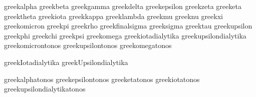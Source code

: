  greekalpha              {}
 greekbeta               {}
 greekgamma              {}
 greekdelta              {}
 greekepsilon            {}
 greekzeta               {}
 greeketa                {}
 greektheta              {}
 greekiota               {}
 greekkappa              {}
 greeklambda             {}
 greekmu                 {}
 greeknu                 {}
 greekxi                 {}
 greekomicron            {}
 greekpi                 {}
 greekrho                {}
 greekfinalsigma         {}
 greeksigma              {}
 greektau                {}
 greekupsilon            {}
 greekphi                {}
 greekchi                {}
 greekpsi                {}
 greekomega              {}
 greekiotadialytika      {}
 greekupsilondialytika   {}
 greekomicrontonos       {}
 greekupsilontonos       {}
 greekomegatonos         {}

 greekIotadialytika          {}
 greekUpsilondialytika       {}

 greekalphatonos             {}
 greekepsilontonos           {}
 greeketatonos               {}
 greekiotatonos              {}
 greekupsilondialytikatonos  {}

\stopencoding


\startencoding[uc]

